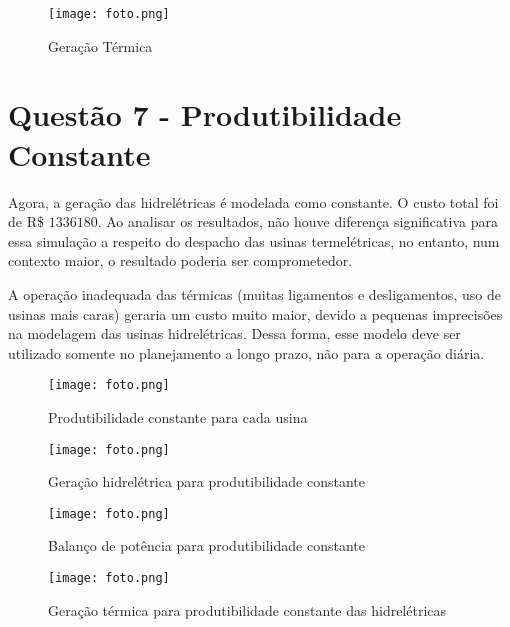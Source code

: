 \documentclass[a4paper,12pt,twoside]{article}
\begin{document}
\begin{figure}[h!]
    \centering
  \texttt{[image: foto.png]}
  \caption{Geração Térmica}\label{q6}
\end{figure}

\newpage
\section{Questão 7 - Produtibilidade Constante}
Agora, a geração das hidrelétricas é modelada como constante.
O custo total foi de R\$ \(1336180\).
Ao analisar os resultados, não houve diferença significativa para essa simulação
a respeito do despacho das usinas termelétricas, no entanto,
num contexto maior, o resultado poderia ser comprometedor.

A operação inadequada das térmicas (muitas ligamentos e desligamentos,
uso de usinas mais caras) geraria um custo muito maior,
devido a pequenas imprecisões na modelagem das usinas hidrelétricas.
Dessa forma, esse modelo deve ser utilizado somente
no planejamento a longo prazo, não para a operação diária.

\begin{figure}[h!]
    \centering
  \texttt{[image: foto.png]}
  \caption{Produtibilidade constante para cada usina}\label{q7a}
\end{figure}

\begin{figure}[h!]
    \centering
  \texttt{[image: foto.png]}
  \caption{Geração hidrelétrica para produtibilidade constante}\label{q7b}
\end{figure}

\begin{figure}[h!]
    \centering
  \texttt{[image: foto.png]}
  \caption{Balanço de potência para produtibilidade constante}\label{q7c}
\end{figure}

\begin{figure}[h!]
    \centering
  \texttt{[image: foto.png]}
  \caption{Geração térmica para produtibilidade constante das hidrelétricas}\label{q7d}
\end{figure}
\end{document}
